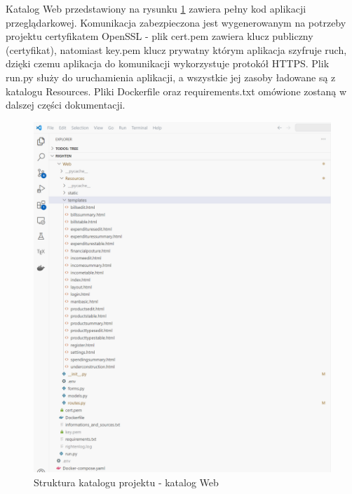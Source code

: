 \documentclass[a4paper,10pt, twoside]{report}
\begin{document}
\begin{large}
{Katalog Web przedstawiony na rysunku \ref*{fig:projectdirectoryweb} zawiera 
pełny kod aplikacji przeglądarkowej. Komunikacja zabezpieczona jest 
wygenerowanym na potrzeby projektu certyfikatem OpenSSL - plik cert.pem zawiera 
klucz publiczny (certyfikat), natomiast key.pem klucz prywatny którym aplikacja 
szyfruje ruch, dzięki czemu aplikacja do komunikacji wykorzystuje protokół 
HTTPS. Plik run.py służy do uruchamienia aplikacji, a wszystkie jej zasoby 
ładowane są z katalogu Resources. Pliki Dockerfile oraz requirements.txt 
omówione zostaną w dalszej części dokumentacji.}

\begin{figure}[H]           %
    \centering
    \includegraphics[width=12cm]{figures/Righten_project_directory_web.png}
    \caption{Struktura katalogu projektu - katalog Web}
    \label{fig:projectdirectoryweb}
\end{figure}


\end{large}
\end{document}

